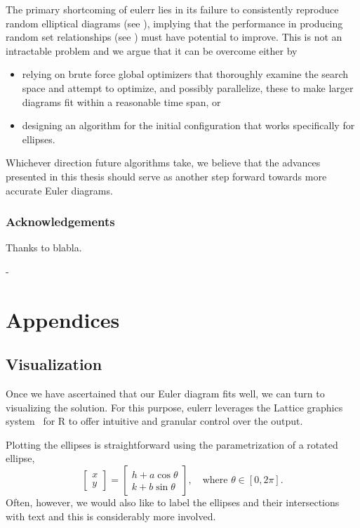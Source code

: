 \documentclass[
  oneside,
  openany,
  numbers=noendperiod,
  parskip=half,
  bibliography=totoc
]{scrbook}\usepackage[]{graphicx}\usepackage{xcolor}
\newlength{\overhang}
\newenvironment{fullwidth}{
  \begin{addmargin*}[0em]{-\overhang}
}{
  \end{addmargin*}
}
\newcommand{\pkg}[1]{{\fontseries{b}\selectfont #1}}
\begin{document}
The primary shortcoming of \pkg{eulerr} lies in its failure to consistently
reproduce random elliptical diagrams (see ), implying that the
performance in producing random set relationships (see )
must have potential to improve. This is not an intractable problem and we
argue that it can be overcome either by
\begin{itemize}
\item relying on brute force global optimizers that thoroughly examine
the search space and attempt to optimize, and possibly parallelize,
these to make larger diagrams fit within a reasonable time span, or
\item designing an algorithm for the initial configuration that works specifically for
ellipses.
\end{itemize}
Whichever direction future algorithms take, we believe that the advances
presented in this thesis should serve as another step forward towards more
accurate Euler diagrams.

\section{Acknowledgements}
\label{sec:acknowledgements}

Thanks to blabla.

\begin{fullwidth}
\part*{Appendices}
\end{fullwidth}
\appendix
\chapter{Visualization}
\label{ap:visualization}

Once we have ascertained that our Euler diagram fits well, we can turn to
visualizing the solution. For this purpose, \pkg{eulerr} leverages the
\pkg{Lattice} graphics system~\citep{Sarkar_2008} for R to offer intuitive and
granular control over the output.

Plotting the ellipses is straightforward using the parametrization of a rotated
ellipse,
%
\begin{equation*}
\begin{bmatrix}
  x \\ y
\end{bmatrix} =
\begin{bmatrix}
  h + a \cos{\theta} \\
  k + b \sin{\theta}
\end{bmatrix},\quad \text{where } \theta \in [0, 2\pi].
\end{equation*}
%
Often, however, we would also like to label the ellipses and their intersections
with text and this is considerably more involved.
\end{document}
